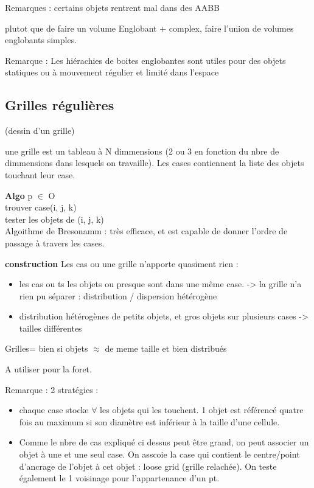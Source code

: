 \documentclass[11pt]{article}
\begin{document}
{Remarques : certains objets rentrent mal dans des AABB

plutot que de faire un volume Englobant + complex, faire l'union de volumes englobants simples.

Remarque : Les hiérachies de boites englobantes sont utiles pour des objets statiques ou à mouvement régulier et limité dans l'espace


\subsection{Grilles régulières}
(dessin d'un grille)

une grille est un tableau à N dimmensions (2 ou 3 en fonction du nbre de dimmensions dans lesquels on travaille). Les cases contiennent la liste des objets touchant leur case.

\vskip 2cm
\textbf{Algo} p $\in$ O\\
trouver case(i, j, k)\\
tester les objets de (i, j, k)\\

Algoithme de Bresonamm : très efficace, et est capable de donner l'ordre de passage à travers les cases.

\vskip 2cm
\textbf{construction}
Les cas ou une grille n'apporte quasiment rien :
\begin{itemize}
	\item les cas ou ts les objets ou presque sont dans une même case. -> la grille n'a rien pu séparer : distribution / dispersion hétérogène
	\item distribution hétérogènes de petits objets, et gros objets sur plusieurs cases -> tailles différentes
\end{itemize}

Grilles= bien si objets $\approx$ de meme taille et bien distribués

A utiliser pour la foret.

Remarque : 2 stratégies :
\begin{itemize}
	\item chaque case stocke $\forall$ les objets qui les touchent. 1 objet est référencé quatre fois au maximum si son diamètre est inférieur à la taille d'une cellule.
	\item Comme le nbre de cas expliqué ci dessus peut être grand, on peut associer un objet à une et une seul case. On asscoie la case qui contient le centre/point d'ancrage de l'objet à cet objet : loose grid (grille relachée). On teste également le 1 voisinage pour l'appartenance d'un pt.
\end{itemize}


}
\end{document}
